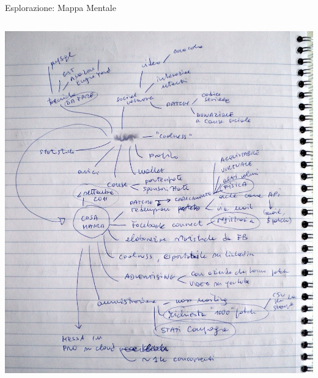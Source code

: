 \begin{frame}{Esplorazione: Mappa Mentale}
\begin{columns}[T]
\begin{column}{.5\textwidth}
				\hspace*{-0.4cm} \includegraphics[scale=0.17]{images/mindmap-2}
		    \end{column}
		 \end{columns}
	\end{frame}

